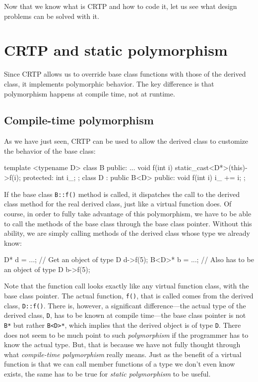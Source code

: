 Now that we know what is CRTP and how to code it, let us see what design problems can be solved with it.

\section{CRTP and static polymorphism}

Since CRTP allows us to override base class functions with those of the derived class, it implements polymorphic behavior. The key difference is that polymorphism happens at compile time, not at runtime.

\subsection{Compile-time polymorphism}

As we have just seen, CRTP can be used to allow the derived class to customize the behavior of the base class:

\begin{code}
template <typename D> class B {
  public:
  ...
  void f(int i) { static_cast<D*>(this)->f(i); }
  protected:
  int i_;
};
class D : public B<D> {
  public:
  void f(int i) { i_ += i; }
};
\end{code}

If the base class \texttt{B::f()} method is called, it dispatches the call to the derived class method for the real derived class, just like a virtual function does. Of course, in order to fully take advantage of this polymorphism, we have to be able to call the methods of the base class through the base class pointer. Without this ability, we are simply calling methods of the derived class whose type we already know:

\begin{code}
D* d = ...; // Get an object of type D
d->f(5);
B<D>* b = ...; // Also has to be an object of type D
b->f(5);
\end{code}

Note that the function call looks exactly like any virtual function class, with the base class pointer. The actual function, \texttt{f()}, that is called comes from the derived class, \texttt{D::f()}. There is, however, a significant difference---the actual type of the derived class, \texttt{D}, has to be known at compile time---the base class pointer is not \texttt{B*} but rather \texttt{B\textless{}D\textgreater{}*}, which implies that the derived object is of type \texttt{D}. There does not seem to be much point to such \emph{polymorphism} if the programmer has to know the actual type. But, that is because we have not fully thought through what \emph{compile-time polymorphism} really means. Just as the benefit of a virtual function is that we can call member functions of a type we don't even know exists, the same has to be true for \emph{static polymorphism} to be useful.

